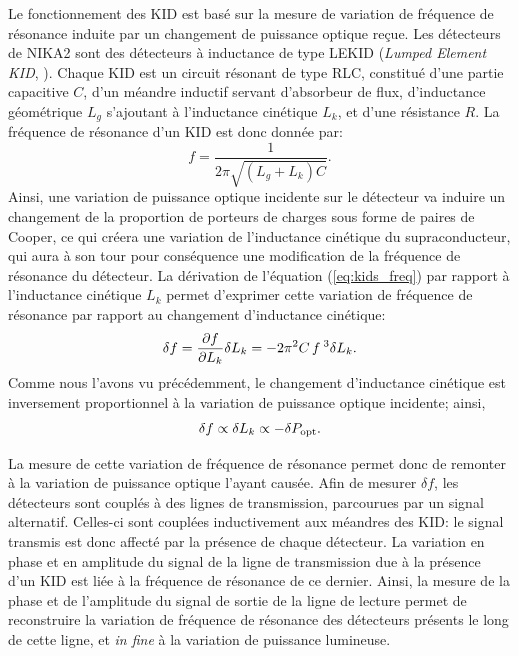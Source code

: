Le fonctionnement des KID est basé sur la mesure de variation de fréquence de résonance induite par un changement de puissance optique reçue.
Les détecteurs de NIKA2 sont des détecteurs à inductance de type LEKID (\textit{Lumped Element KID}, \cite{roesch_development_2012}).
Chaque KID est un circuit résonant de type RLC, constitué d'une partie capacitive $C$, d'un méandre inductif servant d'absorbeur de flux, d'inductance géométrique $L_g$ s'ajoutant à l'inductance cinétique $L_k$, et d'une résistance $R$.
La fréquence de résonance d'un KID est donc donnée par:
\begin{equation}
    \label{eq:kids_freq}
    f = \frac{1}{2\pi \sqrt{(L_g + L_k)C}}.
\end{equation}
Ainsi, une variation de puissance optique incidente sur le détecteur va induire un changement de la proportion de porteurs de charges sous forme de paires de Cooper, ce qui créera une variation de l'inductance cinétique du supraconducteur, qui aura à son tour pour conséquence une modification de la fréquence de résonance du détecteur.
La dérivation de l'équation (\ref{eq:kids_freq}) par rapport à l'inductance cinétique $L_k$ permet d'exprimer cette variation de fréquence de résonance par rapport au changement d'inductance cinétique:
\begin{equation}
    \delta f = \frac{\partial f}{\partial L_k} \delta L_k = -2 \pi^2 C \, f^{\;3} \delta L_k.
\end{equation}
Comme nous l'avons vu précédemment, le changement d'inductance cinétique est inversement proportionnel à la variation de puissance optique incidente; ainsi,
\begin{equation}
    \delta f \propto \delta L_k \propto -\delta P_{\rm opt}.
\end{equation}

La mesure de cette variation de fréquence de résonance permet donc de remonter à la variation de puissance optique l'ayant causée.
Afin de mesurer $\delta f$, les détecteurs sont couplés à des lignes de transmission, parcourues par un signal alternatif.
Celles-ci sont couplées inductivement aux méandres des KID: le signal transmis est donc affecté par la présence de chaque détecteur.
La variation en phase et en amplitude du signal de la ligne de transmission due à la présence d'un KID est liée à la fréquence de résonance de ce dernier.
Ainsi, la mesure de la phase et de l'amplitude du signal de sortie de la ligne de lecture permet de reconstruire la variation de fréquence de résonance des détecteurs présents le long de cette ligne, et \textit{in fine} à la variation de puissance lumineuse.

